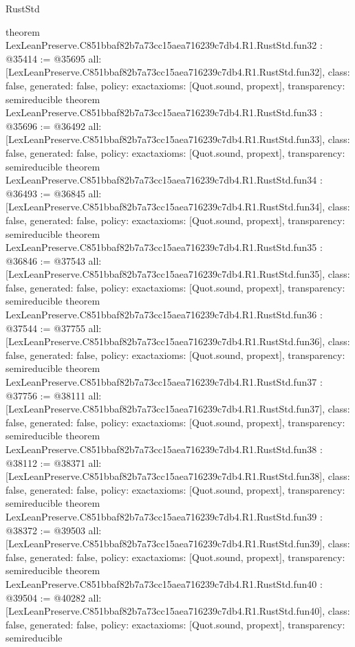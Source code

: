 \begin{lexlean}{RustStd}
\begin{coremodule}
{}
theorem LexLeanPreserve.C851bbaf82b7a73cc15aea716239c7db4.R1.RustStd.fun32 : @35414 := @35695 {
  all: [LexLeanPreserve.C851bbaf82b7a73cc15aea716239c7db4.R1.RustStd.fun32],
  class: false,
  generated: false,
  policy: exact{axioms: [Quot.sound, propext]},
  transparency: semireducible
}
theorem LexLeanPreserve.C851bbaf82b7a73cc15aea716239c7db4.R1.RustStd.fun33 : @35696 := @36492 {
  all: [LexLeanPreserve.C851bbaf82b7a73cc15aea716239c7db4.R1.RustStd.fun33],
  class: false,
  generated: false,
  policy: exact{axioms: [Quot.sound, propext]},
  transparency: semireducible
}
theorem LexLeanPreserve.C851bbaf82b7a73cc15aea716239c7db4.R1.RustStd.fun34 : @36493 := @36845 {
  all: [LexLeanPreserve.C851bbaf82b7a73cc15aea716239c7db4.R1.RustStd.fun34],
  class: false,
  generated: false,
  policy: exact{axioms: [Quot.sound, propext]},
  transparency: semireducible
}
theorem LexLeanPreserve.C851bbaf82b7a73cc15aea716239c7db4.R1.RustStd.fun35 : @36846 := @37543 {
  all: [LexLeanPreserve.C851bbaf82b7a73cc15aea716239c7db4.R1.RustStd.fun35],
  class: false,
  generated: false,
  policy: exact{axioms: [Quot.sound, propext]},
  transparency: semireducible
}
theorem LexLeanPreserve.C851bbaf82b7a73cc15aea716239c7db4.R1.RustStd.fun36 : @37544 := @37755 {
  all: [LexLeanPreserve.C851bbaf82b7a73cc15aea716239c7db4.R1.RustStd.fun36],
  class: false,
  generated: false,
  policy: exact{axioms: [Quot.sound, propext]},
  transparency: semireducible
}
theorem LexLeanPreserve.C851bbaf82b7a73cc15aea716239c7db4.R1.RustStd.fun37 : @37756 := @38111 {
  all: [LexLeanPreserve.C851bbaf82b7a73cc15aea716239c7db4.R1.RustStd.fun37],
  class: false,
  generated: false,
  policy: exact{axioms: [Quot.sound, propext]},
  transparency: semireducible
}
theorem LexLeanPreserve.C851bbaf82b7a73cc15aea716239c7db4.R1.RustStd.fun38 : @38112 := @38371 {
  all: [LexLeanPreserve.C851bbaf82b7a73cc15aea716239c7db4.R1.RustStd.fun38],
  class: false,
  generated: false,
  policy: exact{axioms: [Quot.sound, propext]},
  transparency: semireducible
}
theorem LexLeanPreserve.C851bbaf82b7a73cc15aea716239c7db4.R1.RustStd.fun39 : @38372 := @39503 {
  all: [LexLeanPreserve.C851bbaf82b7a73cc15aea716239c7db4.R1.RustStd.fun39],
  class: false,
  generated: false,
  policy: exact{axioms: [Quot.sound, propext]},
  transparency: semireducible
}
theorem LexLeanPreserve.C851bbaf82b7a73cc15aea716239c7db4.R1.RustStd.fun40 : @39504 := @40282 {
  all: [LexLeanPreserve.C851bbaf82b7a73cc15aea716239c7db4.R1.RustStd.fun40],
  class: false,
  generated: false,
  policy: exact{axioms: [Quot.sound, propext]},
  transparency: semireducible
}
\end{coremodule}
\end{lexlean}
